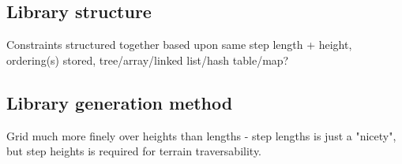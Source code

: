 \subsection{Library structure}
Constraints structured together based upon same step length + height, ordering(s) stored, tree/array/linked list/hash table/map?

\subsection{Library generation method}
Grid much more finely over heights than lengths - step lengths is just a "nicety", but step heights is required for terrain traversability.